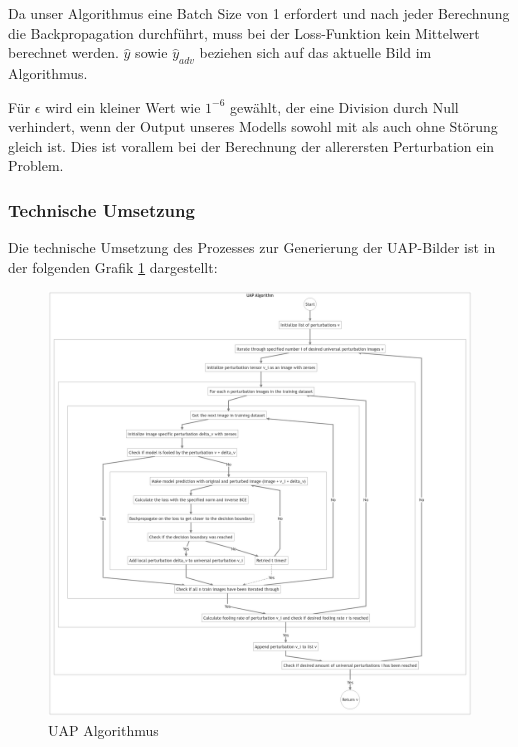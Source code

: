 Da unser Algorithmus eine Batch Size von 1 erfordert und nach jeder Berechnung die Backpropagation durchführt, muss bei der Loss-Funktion kein Mittelwert berechnet werden. $\hat{y}$ sowie $\hat{y}_{adv}$ beziehen sich auf das aktuelle Bild im Algorithmus.

Für $\epsilon$ wird ein kleiner Wert wie $1^{-6}$ gewählt, der eine Division durch Null verhindert, wenn der Output unseres Modells sowohl mit als auch ohne Störung gleich ist. Dies ist vorallem bei der Berechnung der allerersten Perturbation ein Problem.

\newpage
\subsubsection{Technische Umsetzung}
Die technische Umsetzung des Prozesses zur Generierung der UAP-Bilder ist in der folgenden Grafik \ref{fig:05-uap_algorithm} dargestellt:

\begin{figure}[H]
    \centering
    \includegraphics[width=14.5cm]{01-images/05-UAP_ALG}
    \caption{UAP Algorithmus}
    \label{fig:05-uap_algorithm}
\end{figure}


